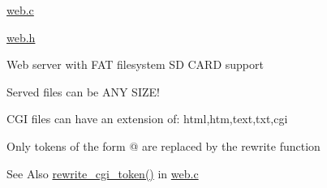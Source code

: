 \begin{DoxyItemize}
\begin{DoxyItemize}
\item \hyperlink{web_8c}{web.\-c}
\item \hyperlink{web_8h}{web.\-h}
\begin{DoxyItemize}
\item Web server with F\-A\-T filesystem S\-D C\-A\-R\-D support
\item Served files can be A\-N\-Y S\-I\-Z\-E!
\item C\-G\-I files can have an extension of\-: html,htm,text,txt,cgi
\begin{DoxyItemize}
\item Only tokens of the form @ are replaced by the rewrite function
\begin{DoxyItemize}
\item \begin{DoxySeeAlso}{See Also}
\hyperlink{web_8h_abfb5be0ab21dfe56bc934a8965154384}{rewrite\-\_\-cgi\-\_\-token()} in \hyperlink{web_8c}{web.\-c}
\end{DoxySeeAlso}


\end{DoxyItemize}
\end{DoxyItemize}
\end{DoxyItemize}
\end{DoxyItemize}
\end{DoxyItemize}

